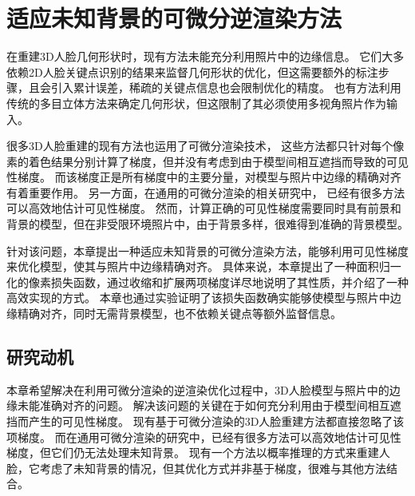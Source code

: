 \chapter{适应未知背景的可微分逆渲染方法}
\label{chap:method}

在重建3D人脸几何形状时，现有方法未能充分利用照片中的边缘信息。
它们大多依赖2D人脸关键点识别的结果来监督几何形状的优化，但这需要额外的标注步骤，且会引入累计误差，稀疏的关键点信息也会限制优化的精度。
也有方法利用传统的多目立体方法来确定几何形状，但这限制了其必须使用多视角照片作为输入。

很多3D人脸重建的现有方法也运用了可微分渲染技术，
这些方法都只针对每个像素的着色结果分别计算了梯度，但并没有考虑到由于模型间相互遮挡而导致的可见性梯度。
而该梯度正是所有梯度中的主要分量，对模型与照片中边缘的精确对齐有着重要作用。
另一方面，在通用的可微分渲染的相关研究中，
已经有很多方法可以高效地估计可见性梯度。
然而，计算正确的可见性梯度需要同时具有前景和背景的模型，但在非受限环境照片中，由于背景多样，很难得到准确的背景模型。

针对该问题，本章提出一种适应未知背景的可微分渲染方法，能够利用可见性梯度来优化模型，使其与照片中边缘精确对齐。
具体来说，本章提出了一种面积归一化的像素损失函数，通过收缩和扩展两项梯度详尽地说明了其性质，并介绍了一种高效实现的方式。
本章也通过实验证明了该损失函数确实能够使模型与照片中边缘精确对齐，同时无需背景模型，也不依赖关键点等额外监督信息。

\section{研究动机}

本章希望解决在利用可微分渲染的逆渲染优化过程中，3D人脸模型与照片中的边缘未能准确对齐的问题。
解决该问题的关键在于如何充分利用由于模型间相互遮挡而产生的可见性梯度。
现有基于可微分渲染的3D人脸重建方法都直接忽略了该项梯度。
而在通用可微分渲染的研究中，已经有很多方法可以高效地估计可见性梯度，但它们仍无法处理未知背景。
现有一个方法\citep{SchonbornEFV15}以概率推理的方式来重建人脸，它考虑了未知背景的情况，但其优化方式并非基于梯度，很难与其他方法结合。

